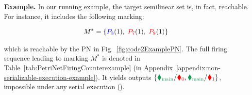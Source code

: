 \begin{enumerate}
\begin{tcolorbox}[colback=black!5!white, colframe=black, boxrule=1pt]
	\textbf{Example.}
	In our running example, the target semilinear set is, in fact, reachable. For instance, it includes the following marking:
	
	\[
	M^* = \{\textcolor{blue}{P_3}(1),\;\textcolor{red}{P_7}(1),\;\textcolor{red}{P_8}(1)\}
	\]
	
	which is reachable by the PN in Fig.~\ref{fig:code2ExamplePN}. The full firing sequence leading to marking $M^*$ is denoted in Table~\ref{tab:PetriNetFiringCounterexample} (in Appendix~\ref{appendix:non-serializable-execution-example}).
It yields outputs $\{{\color{ForestGreen}\blacklozenge_\text{main}}/{\color{red}\blacklozenge_0},{\color{ForestGreen}\blacklozenge_\text{main}}/{\color{red}\blacklozenge_1}\}$, impossible under any serial execution ().
\end{tcolorbox} 
%
%		
%		
%		
%		
	

\end{enumerate}


